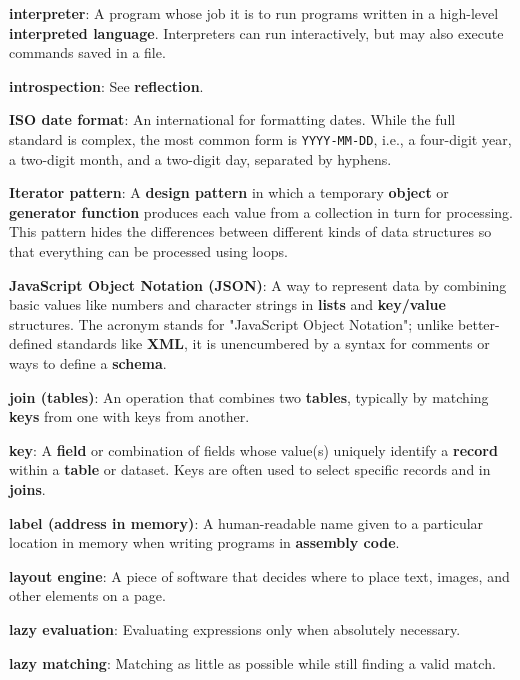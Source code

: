 \documentclass{scrbook}
\newcommand{\glosskey}[1]{\textbf{#1}}
\begin{document}
\noindent \textbf{\glosskey{interpreter}}: 
A program whose job it is to run programs written in a high-level \glosskey{interpreted language}. Interpreters can run interactively, but may also execute commands saved in a file.


\noindent \textbf{\glosskey{introspection}}: 
See \glosskey{reflection}.


\noindent \textbf{\glosskey{ISO date format}}: 
An international for formatting dates. While the full standard is complex, the most common form is \texttt{YYYY-MM-DD}, i.e., a four-digit year, a two-digit month, and a two-digit day, separated by hyphens.


\noindent \textbf{\glosskey{Iterator pattern}}: 
A \glosskey{design pattern} in which a temporary \glosskey{object} or \glosskey{generator function} produces each value from a collection in turn for processing. This pattern hides the differences between different kinds of data structures so that everything can be processed using loops.


\noindent \textbf{\glosskey{JavaScript Object Notation} (JSON)}: 
A way to represent data by combining basic values like numbers and character strings in \glosskey{lists} and \glosskey{key/value} structures. The acronym stands for "JavaScript Object Notation"; unlike better-defined standards like \glosskey{XML}, it is unencumbered by a syntax for comments or ways to define a \glosskey{schema}.


\noindent \textbf{\glosskey{join (tables)}}: 
An operation that combines two \glosskey{tables}, typically by matching \glosskey{keys} from one with keys from another.


\noindent \textbf{\glosskey{key}}: 
A \glosskey{field} or combination of fields whose value(s) uniquely identify a \glosskey{record} within a \glosskey{table} or dataset. Keys are often used to select specific records and in \glosskey{joins}.


\noindent \textbf{\glosskey{label (address in memory)}}: 
A human-readable name given to a particular location in memory when writing programs in \glosskey{assembly code}.


\noindent \textbf{\glosskey{layout engine}}: 
A piece of software that decides where to place text, images, and other elements on a page.


\noindent \textbf{\glosskey{lazy evaluation}}: 
Evaluating expressions only when absolutely necessary.


\noindent \textbf{\glosskey{lazy matching}}: 
Matching as little as possible while still finding a valid match.
\end{document}
